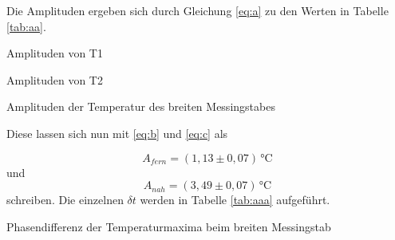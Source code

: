 \noindent Die Amplituden ergeben sich durch Gleichung \ref{eq:a} zu den Werten in Tabelle \ref{tab:aa}.
 
 
 \begin{table}[H]
  \centering
    \begin{subtable}{.42\linewidth}
      \centering
            \caption{Amplituden von T1}

    \end{subtable}
    \begin{subtable}{.42\linewidth}
      \centering
           \caption{Amplituden von T2}

    \end{subtable} 
        \caption{Amplituden der Temperatur des breiten Messingstabes}
    \label{tab:aa}
\end{table}
\noindent Diese lassen sich nun mit \ref{eq:b} und \ref{eq:c} als 

\begin{equation*}
  A_{fern}=(1,13 \pm 0,07)\,\si{\celsius} 
\end{equation*}
\noindent und
\begin{equation*}
  A_{nah}=(3,49 \pm 0,07)\,\si{\celsius} 
\end{equation*}
\noindent schreiben. Die einzelnen $\delta t$ werden in Tabelle \ref{tab:aaa} aufgeführt.


\begin{table}[H]
      \centering

        \caption{Phasendifferenz der Temperaturmaxima beim breiten Messingstab}
    \label{tab:aaa}
\end{table}


